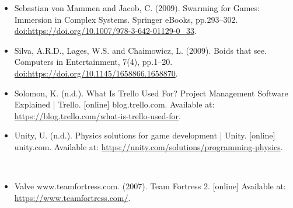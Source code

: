 \documentclass{article}
\begin{document}
\begin{itemize}
\item Sebastian von Mammen and Jacob, C. (2009). Swarming for Games: Immersion in Complex Systems. Springer eBooks, pp.293–302. \href{https://doi.org/https://doi.org/10.1007/978-3-642-01129-0_33}{doi:https://doi.org/10.1007/978-3-642-01129-0_33}.
\end{itemize}


\begin{itemize}
\item Silva, A.R.D., Lages, W.S. and Chaimowicz, L. (2009). Boids that see. Computers in Entertainment, 7(4), pp.1–20. \href{https://doi.org/https://doi.org/10.1145/1658866.1658870}{doi:https://doi.org/10.1145/1658866.1658870}.
\end{itemize}


\begin{itemize}
\item Solomon, K. (n.d.). What Is Trello Used For? Project Management Software Explained | Trello. [online] blog.trello.com. Available at: \url{https://blog.trello.com/what-is-trello-used-for}.
\end{itemize}


\begin{itemize}
\item Unity, U. (n.d.). Physics solutions for game development | Unity. [online] unity.com. Available at: \url{https://unity.com/solutions/programming-physics}.
\end{itemize}

‌
\begin{itemize}
\item Valve www.teamfortress.com. (2007). Team Fortress 2. [online] Available at: \url{https://www.teamfortress.com/}.
\end{itemize}
\end{document}
